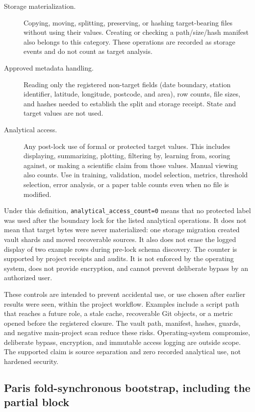 \begin{description}
    \item[Storage materialization.] Copying, moving, splitting, preserving, or hashing target-bearing files without using their values.  Creating or checking a path/size/hash manifest also belongs to this category.  These operations are recorded as storage events and do not count as target analysis.
    \item[Approved metadata handling.] Reading only the registered non-target fields (date boundary, station identifier, latitude, longitude, postcode, and area), row counts, file sizes, and hashes needed to establish the split and storage receipt.  State and target values are not used.
    \item[Analytical access.] Any post-lock use of formal or protected target values.  This includes displaying, summarizing, plotting, filtering by, learning from, scoring against, or making a scientific claim from those values.  Manual viewing also counts.  Use in training, validation, model selection, metrics, threshold selection, error analysis, or a paper table counts even when no file is modified.
\end{description}

Under this definition, \texttt{analytical\_access\_count=0} means that no protected label was used after the boundary lock for the listed analytical operations.  It does not mean that target bytes were never materialized: one storage migration created vault shards and moved recoverable sources.  It also does not erase the logged display of two example rows during pre-lock schema discovery.  The counter is supported by project receipts and audits.  It is not enforced by the operating system, does not provide encryption, and cannot prevent deliberate bypass by an authorized user.

These controls are intended to prevent accidental use, or use chosen after earlier results were seen, within the project workflow.  Examples include a script path that reaches a future role, a stale cache, recoverable Git objects, or a metric opened before the registered closure.  The vault path, manifest, hashes, guards, and negative main-project scan reduce these risks.  Operating-system compromise, deliberate bypass, encryption, and immutable access logging are outside scope.  The supported claim is source separation and zero recorded analytical use, not hardened security.

\subsection{Paris fold-synchronous bootstrap, including the partial block}
\label{sec:appendix-paris-bootstrap}

